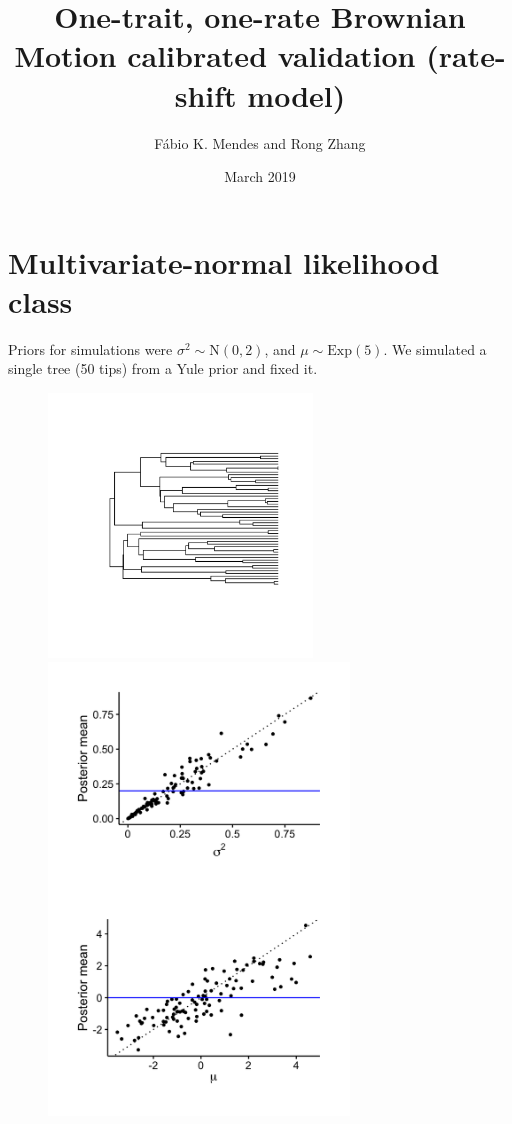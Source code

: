 \documentclass{article}
\title{One-trait, one-rate Brownian Motion calibrated validation
  (rate-shift model)}
\author{F\'{a}bio K. Mendes and Rong Zhang}
\date{March 2019}
\begin{document}
\maketitle

\newpage

\section{Multivariate-normal likelihood class}

Priors for simulations were $\sigma^2 \sim \text{N}(0, 2)$, and $\mu \sim \text{Exp}(5)$. We simulated a single tree (50 tips) from a Yule prior and fixed it.

\begin{figure}[!ht]
  \begin{minipage}[c]{.4\textwidth}
    \centering
    \includegraphics[width=7cm]{../BMMVNShiftOneRate_ultra_tree.png}
  \end{minipage}
  \hfill
  \begin{minipage}{.5\textwidth}
    \centering
    \includegraphics[width=8cm]{../BMMVNShiftOneRate_ultra_graphs.png}
  \end{minipage}
\end{figure}
\end{document}
